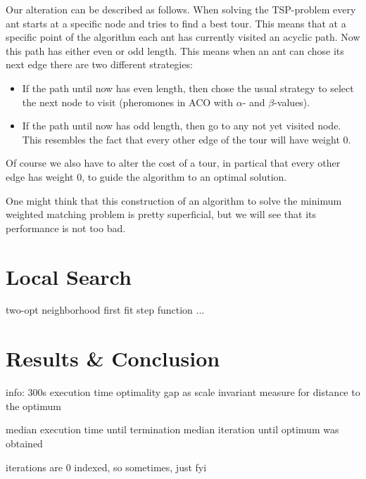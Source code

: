 \documentclass[12pt]{article}
\begin{document}
Our alteration can be described as follows.
When solving the TSP-problem every ant starts at a specific node and tries to find a best tour.
This means that at a specific point of the algorithm each ant has currently visited an acyclic path.
Now this path has either even or odd length.
This means when an ant can chose its next edge there are two different strategies:
\begin{itemize}
    \item If the path until now has even length, then chose the usual strategy to select the next node to visit (pheromones in ACO with $\alpha$- and $\beta$-values).
    \item If the path until now has odd length, then go to any not yet visited node.
    This resembles the fact that every other edge of the tour will have weight 0.
\end{itemize}
Of course we also have to alter the cost of a tour, in partical that every other edge has weight 0, to guide the algorithm to an optimal solution.

One might think that this construction of an algorithm to solve the minimum weighted matching problem is pretty superficial, but we will see that its performance is not too bad.

\section{Local Search}
two-opt neighborhood
first fit step function 
...



\section{Results \& Conclusion}

info:
300s execution time
optimality gap as scale invariant measure for distance to the optimum

median execution time until termination
median iteration until optimum was obtained 

iterations are 0 indexed, so sometimes, just fyi
\end{document}

